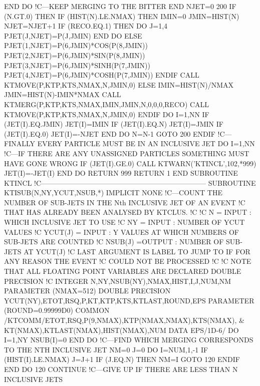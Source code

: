       END DO
!C---KEEP MERGING TO THE BITTER END
      NJET=0
200   IF (N.GT.0) THEN
         IF (HIST(N).LE.NMAX) THEN
            IMIN=0
            JMIN=HIST(N)
            NJET=NJET+1
            IF (RECO.EQ.1) THEN
               DO J=1,4
                  PJET(J,NJET)=P(J,JMIN)
               END DO
            ELSE
               PJET(1,NJET)=P(6,JMIN)*COS(P(8,JMIN))
               PJET(2,NJET)=P(6,JMIN)*SIN(P(8,JMIN))
               PJET(3,NJET)=P(6,JMIN)*SINH(P(7,JMIN))
               PJET(4,NJET)=P(6,JMIN)*COSH(P(7,JMIN))
            ENDIF
            CALL KTMOVE(P,KTP,KTS,NMAX,N,JMIN,0)
         ELSE
            IMIN=HIST(N)/NMAX
            JMIN=HIST(N)-IMIN*NMAX
            CALL KTMERG(P,KTP,KTS,NMAX,IMIN,JMIN,N,0,0,0,RECO)
            CALL KTMOVE(P,KTP,KTS,NMAX,N,JMIN,0)
         ENDIF
         DO I=1,NN
            IF (JET(I).EQ.JMIN) JET(I)=IMIN
            IF (JET(I).EQ.N) JET(I)=JMIN
            IF (JET(I).EQ.0) JET(I)=-NJET
         END DO
         N=N-1
         GOTO 200
      ENDIF
!C---FINALLY EVERY PARTICLE MUST BE IN AN INCLUSIVE JET
      DO I=1,NN
!C---IF THERE ARE ANY UNASSIGNED PARTICLES SOMETHING MUST HAVE GONE WRONG
         IF (JET(I).GE.0) CALL KTWARN('KTINCL',102,*999)
         JET(I)=-JET(I)
      END DO
      RETURN
 999  RETURN 1
    END SUBROUTINE KTINCL
!C-----------------------------------------------------------------------
    SUBROUTINE KTISUB(N,NY,YCUT,NSUB,*)
      IMPLICIT NONE
!C---COUNT THE NUMBER OF SUB-JETS IN THE Nth INCLUSIVE JET OF AN EVENT
!C   THAT HAS ALREADY BEEN ANALYSED BY KTCLUS.
!C
!C   N       = INPUT : WHICH INCLUSIVE JET TO USE
!C   NY      = INPUT : NUMBER OF YCUT VALUES
!C   YCUT(J) = INPUT : Y VALUES AT WHICH NUMBERS OF SUB-JETS ARE COUNTED
!C   NSUB(J) =OUTPUT : NUMBER OF SUB-JETS AT YCUT(J)
!C   LAST ARGUMENT IS LABEL TO JUMP TO IF FOR ANY REASON THE EVENT
!C   COULD NOT BE PROCESSED
!C
!C   NOTE THAT ALL FLOATING POINT VARIABLES ARE DECLARED DOUBLE PRECISION
!C
      INTEGER N,NY,NSUB(NY),NMAX,HIST,I,J,NUM,NM
      PARAMETER (NMAX=512)
      DOUBLE PRECISION YCUT(NY),ETOT,RSQ,P,KT,KTP,KTS,KTLAST,ROUND,EPS
      PARAMETER (ROUND=0.99999D0)
      COMMON /KTCOMM/ETOT,RSQ,P(9,NMAX),KTP(NMAX,NMAX),KTS(NMAX), &
           KT(NMAX),KTLAST(NMAX),HIST(NMAX),NUM
      DATA EPS/1D-6/
      DO I=1,NY
         NSUB(I)=0
      END DO
!C---FIND WHICH MERGING CORRESPONDS TO THE NTH INCLUSIVE JET
      NM=0
      J=0
      DO I=NUM,1,-1
        IF (HIST(I).LE.NMAX) J=J+1
        IF (J.EQ.N) THEN
          NM=I
          GOTO 120
        ENDIF
     END DO
120  CONTINUE
!C---GIVE UP IF THERE ARE LESS THAN N INCLUSIVE JETS
